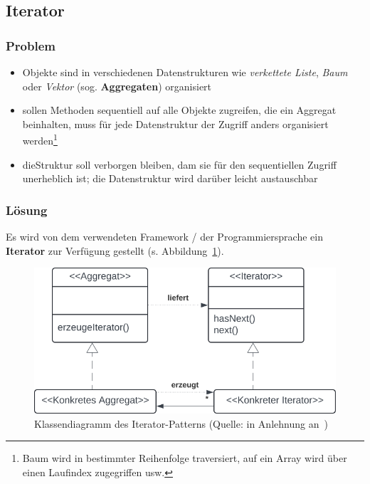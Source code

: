 \subsection{Iterator}

\subsubsection*{Problem}
\begin{itemize}
    \item Objekte sind in verschiedenen Datenstrukturen wie \textit{verkettete Liste}, \textit{Baum} oder \textit{Vektor} (sog. \textbf{Aggregaten}) organisiert
    \item sollen Methoden sequentiell auf alle Objekte zugreifen, die ein Aggregat beinhalten, muss für jede Datenstruktur der Zugriff anders organisiert werden\footnote{
    Baum wird in bestimmter Reihenfolge traversiert, auf ein Array wird über einen Laufindex zugegriffen usw.
    }
    \item dieStruktur soll verborgen bleiben, dam sie für den sequentiellen Zugriff unerheblich ist; die Datenstruktur wird darüber leicht austauschbar
\end{itemize}

\subsubsection*{Lösung}
Es wird von dem verwendeten Framework / der Programmiersprache ein \textbf{Iterator} zur Verfügung gestellt (s. Abbildung~\ref{fig:iterator}).


\begin{figure}
    \centering
    \includegraphics[scale=0.4]{part two/Objektorientierter Entwurf/img/iterator}
    \caption{Klassendiagramm des Iterator-Patterns (Quelle: in Anlehnung an~\cite[60, Abb. 3.9]{Wed09b})}
    \label{fig:iterator}
\end{figure}


